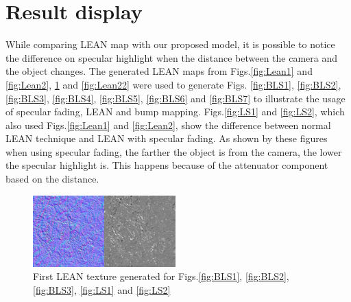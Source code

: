 \documentclass[10pt, conference]{IEEEtran}
\begin{document}
\section{Result display}
\label{sec:results}
%
While comparing LEAN map with our proposed model, it is possible to notice the difference on specular highlight when the distance between the camera and the object changes. The generated LEAN maps from Figs.\ref{fig:Lean1} and \ref{fig:Lean2}, \ref{fig:Lean21} and \ref{fig:Lean22} were used to generate Figs. \ref{fig:BLS1}, \ref{fig:BLS2}, \ref{fig:BLS3}, \ref{fig:BLS4}, \ref{fig:BLS5}, \ref{fig:BLS6} and \ref{fig:BLS7} to illustrate the usage of specular fading, LEAN and bump mapping. Figs.\ref{fig:LS1} and \ref{fig:LS2}, which also used Figs.\ref{fig:Lean1} and \ref{fig:Lean2}, show the difference between normal LEAN technique and LEAN with specular fading. As shown by these figures when using specular fading, the farther the object is from the camera, the lower the specular highlight is. This happens because of the attenuator component based on the distance.
\begin{figure}[here]
	\includegraphics[width=0.49\textwidth]{figs/Lean21.png}
	\caption{First LEAN texture generated for Figs.\ref{fig:BLS1}, \ref{fig:BLS2}, \ref{fig:BLS3}, \ref{fig:LS1} and \ref{fig:LS2}}
	\label{fig:Lean21}
\end{figure}
\end{document}
